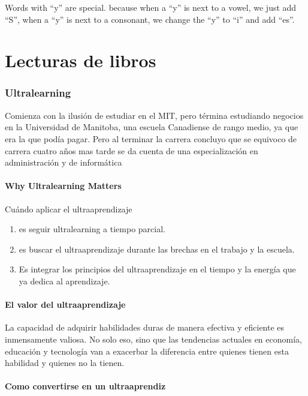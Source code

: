 Words with ``y'' are special. because when a ``y'' is next to a vowel, we just add ``S'', when a ``y'' is next to a consonant, we change the ``y'' to ``i'' and add ``es''.

\part{Lecturas de libros}

\section{Ultralearning}

Comienza con la ilusi\'on de estudiar en el MIT, pero t\'ermina estudiando negocios en la Universidad de Manitoba, una escuela Canadiense de rango medio, ya que era la que pod\'ia pagar. Pero al terminar la carrera concluyo que se equivoco de carrera cuatro a\~nos mas tarde se da cuenta de una especializaci\'on en administraci\'on y de inform\'atica 

\subsection{Why Ultralearning Matters}

Cu\'ando aplicar el ultraaprendizaje 

\begin{enumerate}
	\item es seguir ultralearning a tiempo parcial.
	\item es buscar el ultraaprendizaje durante las brechas en el trabajo y la escuela.
	\item Es integrar los principios del ultraaprendizaje en el tiempo y la energía que ya dedica al aprendizaje.
	
\end{enumerate}


\subsection{El valor del ultraaprendizaje}

La capacidad de adquirir habilidades duras de manera efectiva y eficiente es inmensamente valiosa. No solo eso, sino que las tendencias actuales en econom\'ia, educaci\'on y tecnolog\'ia van a exacerbar la diferencia entre quienes tienen esta habilidad y quienes no la tienen.

\subsection{Como convertirse en un ultraaprendiz}

